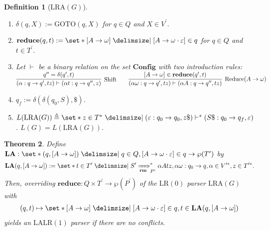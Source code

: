 \documentclass[12pt]{article}
\newtheorem{theorem}{Theorem}
\newtheorem{definition}[theorem]{Definition}
\newcommand{\powerset}
{ \wp }
\begin{document}
\begin{definition}[$\mathrm{LRA}(G)$]
\begin{enumerate}
\item[$\mathrm{(xii)}$] $\delta ( q , X ) := \mathrm{GOTO} ( q , X )$ for $q \in Q$ and $X \in V^\prime$.
\item[$\mathrm{(xiii)}$] $\mathbf{reduce} ( q , t ) := \set*{ [ A \to \omega ] \mid [ A \to \omega \cdot \varepsilon ] \in q }$ for $q \in Q$ and $t \in T^\prime$.
\item[$\mathrm{(xiv)}$] Let $\vdash$ be a binary relation on the set $\mathbf{Config}$ with two introduction rules: \newline $\begin{matrix} \infer[\mathrm{Shift}]{ ( \alpha : q \to q^\prime , t z ) \vdash ( \alpha t : q \to q^{\prime \prime} , z ) }{ q^{\prime \prime} = \delta ( q^\prime , t ) } & & \infer[\mathrm{Reduce} ( A \to \omega )]{ ( \alpha \omega : q \to q^\prime , t z ) \vdash ( \alpha A : q \to q^{\prime \prime} , t z ) }{ [ A \to \omega ] \in \mathbf{reduce} ( q^\prime , t ) } \end{matrix}$
\item[$\mathrm{(xv)}$] $q_f := \delta ( \delta ( q_0 , S ) , \$ )$.
\item[$\mathrm{(xvi)}$] $L ( \mathrm{LRA} ( G ) ) \triangleq \set*{ z \in { T }^\ast \mid ( \varepsilon : q_0 \to q_0 , z \$ ) \vdash^\ast ( S \$ : q_0 \to q_f , \varepsilon ) }$. $L ( G ) = L ( \mathrm{LRA} ( G ) )$.
\end{enumerate}
\end{definition}

\begin{theorem}
Define $\mathbf{LA} : \set*{ ( q , [ A \to \omega ] ) \mid q \in Q , [ A \to \omega \cdot \varepsilon ] \in q } \to \powerset ( T^\prime )$ by
\begin{align}
\mathbf{LA} ( q , [ A \to \omega ] ) := \set*{ t \in T^\prime \mid S^\prime \xRightarrow[\mathbf{rm}]{}_{P^\prime}^\ast \alpha A t z , \alpha \omega : q_0 \to q , \alpha \in V^{\prime \ast}, z \in T^{\prime \ast} } .
\end{align}
Then, overriding $\mathbf{reduce} : Q \times T^\prime \to \powerset ( P^\prime )$ of the $\mathrm{LR(0)}$ parser $\mathrm{LRA} ( G )$ with
\begin{align*}
( q , t ) \mapsto \set*{ [ A \to \omega ] \mid [ A \to \omega \cdot \varepsilon ] \in q , t \in \mathbf{LA} ( q , [ A \to \omega ] ) }
\end{align*}
yields an $\mathrm{LALR(1)}$ parser if there are no conflicts.
\end{theorem}
\end{document}
